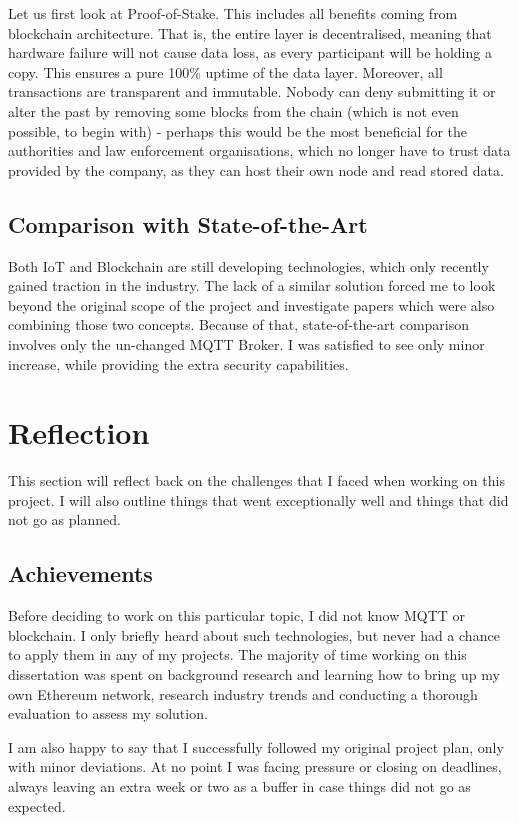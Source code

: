 Let us first look at Proof-of-Stake. This includes all benefits coming from blockchain architecture.  That is, the entire layer is decentralised, meaning that hardware failure will not cause data loss, as every participant will be holding a copy. This ensures a pure 100\% uptime of the data layer. Moreover, all transactions are transparent and immutable. Nobody can deny submitting it or alter the past by removing some blocks from the chain (which is not even possible, to begin with) - perhaps this would be the most beneficial for the authorities and law enforcement organisations, which no longer have to trust data provided by the company, as they can host their own node and read stored data.

\subsection{Comparison with State-of-the-Art}
Both IoT and Blockchain are still developing technologies, which only recently gained traction in the industry. The lack of a similar solution forced me to look beyond the original scope of the project and investigate papers which were also combining those two concepts. Because of that, state-of-the-art comparison involves only the un-changed MQTT Broker. I was satisfied to see only minor increase, while providing the extra security capabilities.
\section{Reflection}
This section will reflect back on the challenges that I faced when working on this project. I will also outline things that went exceptionally well and things that did not go as planned.
\subsection{Achievements}
Before deciding to work on this particular topic, I did not know MQTT or blockchain. I only briefly heard about such technologies, but never had a chance to apply them in any of my projects. The majority of time working on this dissertation was spent on background research and learning how to bring up my own Ethereum network, research industry trends and conducting a thorough evaluation to assess my solution.

I am also happy to say that I successfully followed my original project plan, only with minor deviations. At no point I was facing pressure or closing on deadlines, always leaving an extra week or two as a buffer in case things did not go as expected.

